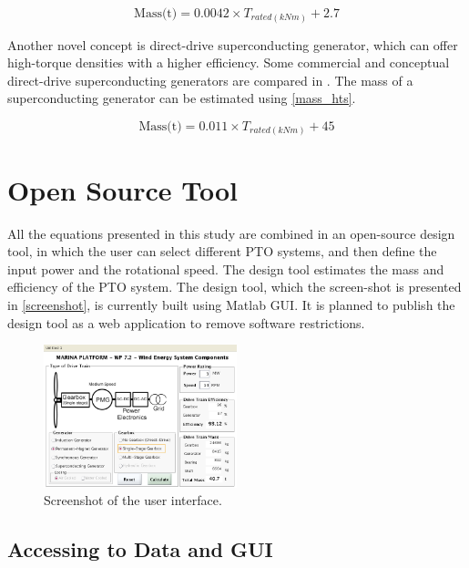 \documentclass{article}\usepackage{graphicx, color}
\begin{document}
\begin{equation}
  \text{Mass(t)} = 0.0042 \times {T_{rated(kNm)}} + 2.7
  \label{mass_hydraulic}
\end{equation}

Another novel concept is direct-drive superconducting generator, which can offer high-torque densities with a higher efficiency. Some commercial and conceptual direct-drive superconducting generators are compared in \cite{Keysan2011b}. The mass of a superconducting generator can be estimated using \autoref{mass_hts}.

\begin{equation}
  \text{Mass(t)} = 0.011 \times {T_{rated(kNm)}} + 45
  \label{mass_hts}
\end{equation}

\section{Open Source Tool}
\label{access}
All the equations presented in this study are combined in an open-source design tool, in which the user can select different PTO systems, and then define the input power and the rotational speed. The design tool estimates the mass and efficiency of the PTO system. The design tool, which the screen-shot is presented in \autoref{screenshot}, is currently built using Matlab GUI. It is planned to publish the design tool as a web application to remove software restrictions. 

\begin{figure}[t]
  \centering
  \includegraphics[width=0.5\textwidth]{images/marina_gui1}
  \caption{Screenshot of the user interface.} 
  \label{screenshot}
\end{figure}

\subsection{Accessing to Data and GUI}
\end{document}
